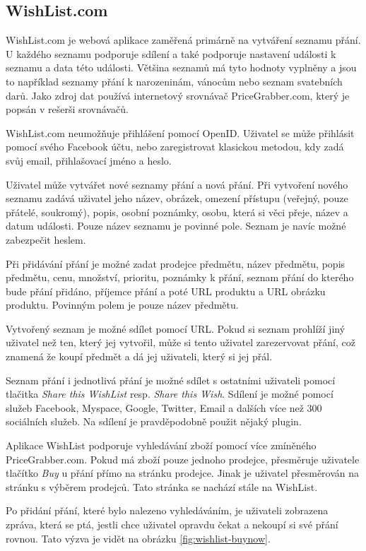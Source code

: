 \subsection{WishList.com}
WishList.com je webová aplikace zaměřená primárně na vytváření seznamu přání. U každého seznamu podporuje sdílení a také podporuje nastavení události k seznamu a data této události. Většina seznamů má tyto hodnoty vyplněny a jsou to například seznamy přání k narozeninám, vánocům nebo seznam svatebních darů. Jako zdroj dat používá internetový srovnávač PriceGrabber.com, který je popsán v rešerši srovnávačů.

WishList.com neumožňuje přihlášení pomocí OpenID. Uživatel se může přihlásit pomocí svého Facebook účtu, nebo zaregistrovat klasickou metodou, kdy zadá svůj email, přihlašovací jméno a heslo.

Uživatel může vytvářet nové seznamy přání a nová přání. Při vytvoření nového seznamu zadává uživatel jeho název, obrázek, omezení přístupu (veřejný, pouze přátelé, soukromý), popis, osobní poznámky, osobu, která si věci přeje, název a datum události. Pouze název seznamu je povinné pole. Seznam je navíc možné zabezpečit heslem.

Při přidávání přání je možné zadat prodejce předmětu, název předmětu, popis předmětu, cenu, množství, prioritu, poznámky k přání, seznam přání do kterého bude přání přidáno, příjemce přání a poté URL produktu a URL obrázku produktu. Povinným polem je pouze název předmětu.

Vytvořený seznam je možné sdílet pomocí URL. Pokud si seznam prohlíží jiný uživatel než ten, který jej vytvořil, může si tento uživatel zarezervovat přání, což znamená že koupí předmět a dá jej uživateli, který si jej přál.

Seznam přání i jednotlivá přání je možné sdílet s ostatními uživateli pomocí tlačitka \emph{Share this WishList} resp. \emph{Share this Wish}. Sdílení je možné pomocí služeb Facebook, Myspace, Google, Twitter, Email a dalších více než 300 sociálních služeb. Na sdílení je pravděpodobně použit nějaký plugin.

Aplikace WishList podporuje vyhledávání zboží pomocí více zmíněného PriceGrabber.com. Pokud má zboží pouze jednoho prodejce, přesměruje uživatele tlačítko \emph{Buy} u přání přímo na stránku prodejce. Jinak je uživatel přesměrován na stránku s výběrem prodejců. Tato stránka se nachází stále na WishList.

Po přidání přání, které bylo nalezeno vyhledáváním, je uživateli zobrazena zpráva, která se ptá, jestli chce uživatel opravdu čekat a nekoupí si své přání rovnou. Tato výzva je vidět na obrázku \ref{fig:wishlist-buynow}.

